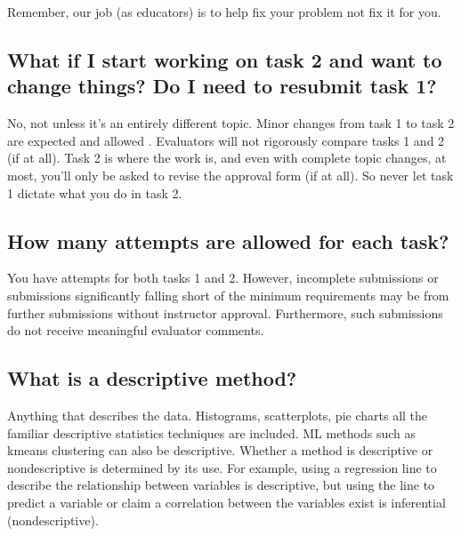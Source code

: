 \documentclass[letterpaper,10pt,english]{jupyterBook}
\begin{document}
\sphinxAtStartPar
Remember, our job (as educators) is to help  fix your problem \sphinxhyphen{}not fix it for you.


\subsection{What if I start working on task 2 and want to change things? Do I need to resubmit task 1?}
\label{\detokenize{task2_c/task2_part_c:what-if-i-start-working-on-task-2-and-want-to-change-things-do-i-need-to-resubmit-task-1}}\label{\detokenize{task2_c/task2_part_c:task2-part-c-faq-what-if-i-start-working-on-task-2-and-want-to-change-things}}
\sphinxAtStartPar
No, not unless it’s an entirely different topic. Minor changes from task 1 to task 2 are expected and allowed . Evaluators will not rigorously compare tasks 1 and 2 (if at all). Task 2 is where the work is, and even with complete topic changes, at most, you’ll only be asked to revise the approval form (if at all). So never let task 1 dictate what you do in task 2.


\subsection{How many attempts are allowed for each task?}
\label{\detokenize{task2_c/task2_part_c:how-many-attempts-are-allowed-for-each-task}}
\sphinxAtStartPar
You have  attempts for both tasks 1 and 2. However, incomplete submissions or submissions significantly falling short of the minimum requirements may be  from further submissions without instructor approval. Furthermore, such submissions do not receive meaningful evaluator comments.


\subsection{What is a descriptive method?}
\label{\detokenize{task2_c/task2_part_c:what-is-a-descriptive-method}}
\sphinxAtStartPar
Anything that describes the data. Histograms, scatterplots, pie charts \sphinxhyphen{}all the familiar descriptive statistics techniques are included. ML methods such as k\sphinxhyphen{}means clustering can also be descriptive. Whether a method is descriptive or non\sphinxhyphen{}descriptive is determined by its use. For example, using a regression line to describe the relationship between variables is descriptive, but using the line to predict a variable or claim a correlation between the variables exist is inferential (non\sphinxhyphen{}descriptive).
\end{document}
